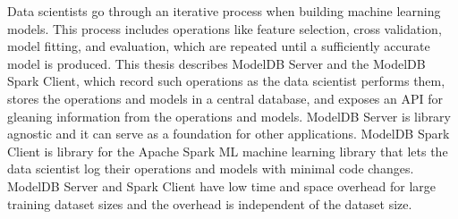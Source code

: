 % 
% 
%
Data scientists go through an iterative process when building machine learning
models. This process includes operations like feature selection, cross validation, 
model fitting, and evaluation, which are repeated until a sufficiently accurate 
model is produced. This thesis describes ModelDB Server and the ModelDB Spark Client,
which record such operations as the data scientist performs them, stores the operations
and models in a central database, and exposes an API for gleaning information from the operations and models. 
ModelDB Server is library agnostic and it can serve as a foundation for other applications.
ModelDB Spark Client is library for the Apache Spark ML machine learning library that 
lets the data scientist log their operations and models with minimal code changes.
ModelDB Server and Spark Client have low time and space overhead for large training
dataset sizes and the overhead is independent of the dataset size.
